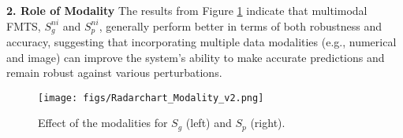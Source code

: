     

\noindent \textbf{2. Role of Modality} The results from Figure \ref{fig:radar_modality} indicate that multimodal FMTS, $S_g^{ni}$ and $S_p^{ni}$, generally perform better in terms of both robustness and accuracy, suggesting that incorporating multiple data modalities (e.g.,  numerical and image) can improve the system's ability to make accurate predictions and remain robust against various perturbations.

\begin{figure}
    \centering
    \texttt{[image: figs/Radarchart\_Modality\_v2.png]}
    \caption{Effect of the modalities for $S_g$ (left) and $S_p$ (right).}
    \label{fig:radar_modality}
    \vspace{-1.8em}
\end{figure}

